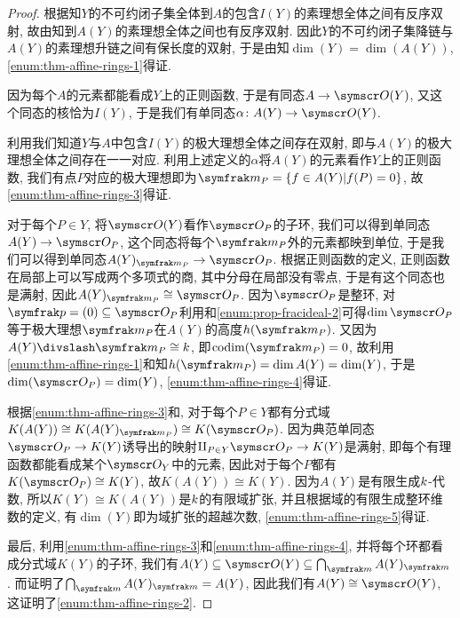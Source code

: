 \begin{proof}
  根据知$Y$的不可约闭子集全体到$A$的包含$I(Y)$的素理想全体之间有反序双射, 故由知到$A(Y)$的素理想全体之间也有反序双射. 因此$Y$的不可约闭子集降链与$A(Y)$的素理想升链之间有保长度的双射, 于是由知$\dim (Y)=\dim (A(Y))$, \ref{enum:thm-affine-rings-1}得证.

  因为每个$A$的元素都能看成$Y$上的正则函数, 于是有同态$A\to \OO (Y)$, 又这个同态的核恰为$I(Y)$, 于是我们有单同态$\alpha\colon A(Y)\to \OO (Y)$.

  利用我们知道$Y$与$A$中包含$I(Y)$的极大理想全体之间存在双射, 即与$A(Y)$的极大理想全体之间存在一一对应. 利用上述定义的$\alpha$将$A(Y)$的元素看作$Y$上的正则函数, 我们有点$P$对应的极大理想即为$\ideal{m}_{P}=\{f\in A(Y)\vert f(P)=0\}$, 故\ref{enum:thm-affine-rings-3}得证.

  对于每个$P\in Y$, 将$\OO (Y)$看作$\OO_P$的子环, 我们可以得到单同态$A(Y)\to \OO_P$, 这个同态将每个$\ideal{m}_P$外的元素都映到单位, 于是我们可以得到单同态$A(Y)_{\ideal{m}_{P}}\to \OO_P$. 根据正则函数的定义, 正则函数在局部上可以写成两个多项式的商, 其中分母在局部没有零点, 于是有这个同态也是满射, 因此$A(Y)_{\ideal{m}_P}\cong \OO_P$. 因为$\OO_P$是整环, 对$\ideal{p}=(0)\subseteq \OO_P$利用和\ref{enum:prop-fracideal-2}可得$\dim \OO_P$等于极大理想$\ideal{m}_P$在$A(Y)$的高度$h(\ideal{m}_P)$. 又因为$A(Y){\divslash}\ideal{m}_P\cong \kk$, 即$\codim (\ideal{m}_P)=0$, 故利用\ref{enum:thm-affine-rings-1}和知$h(\ideal{m}_P)=\dim A(Y)=\dim (Y)$, 于是$\dim (\OO_P)=\dim (Y)$, \ref{enum:thm-affine-rings-4}得证.

  根据\ref{enum:thm-affine-rings-3}和, 对于每个$P\in Y$都有分式域$K(A(Y))\cong K(A(Y)_{\ideal{m}_P})\cong K(\OO_P)$. 因为典范单同态$\OO_P\to K(Y)$诱导出的映射$\amalg_{P\in Y}\OO_P\to K(Y)$是满射, 即每个有理函数都能看成某个$\OO_Y$中的元素, 因此对于每个$P$都有$K(\OO_P)\cong K(Y)$, 故$K(A(Y))\cong K(Y)$. 因为$A(Y)$是有限生成$k$-代数, 所以$K(Y)\cong K(A(Y))$是$k$的有限域扩张, 并且根据域的有限生成整环维数的定义, 有$\dim (Y)$即为域扩张的超越次数, \ref{enum:thm-affine-rings-5}得证.

  最后, 利用\ref{enum:thm-affine-rings-3}和\ref{enum:thm-affine-rings-4}, 并将每个环都看成分式域$K(Y)$的子环, 我们有$A(Y)\subseteq\OO (Y)\subseteq \bigcap_{\ideal{m}} A(Y)_{\ideal{m}}$. 而证明了$\bigcap_{\ideal{m}} A(Y)_{\ideal{m}}= A(Y)$, 因此我们有$A(Y)\cong \OO(Y)$, 这证明了\ref{enum:thm-affine-rings-2}.
\end{proof}

